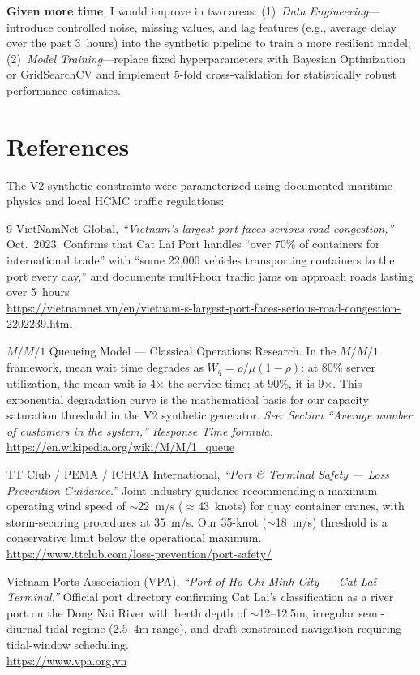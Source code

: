 \documentclass[11pt, a4paper]{article}
\begin{document}
\textbf{Given more time}, I would improve in two areas: (1)~\textit{Data Engineering}---introduce controlled noise, missing values, and lag features (e.g., average delay over the past 3~hours) into the synthetic pipeline to train a more resilient model; (2)~\textit{Model Training}---replace fixed hyperparameters with Bayesian Optimization or GridSearchCV and implement 5-fold cross-validation for statistically robust performance estimates.

\newpage
\section{References}
The V2 synthetic constraints were parameterized using documented maritime physics and local HCMC traffic regulations:

\begin{thebibliography}{9}
VietNamNet Global, \textit{``Vietnam's largest port faces serious road congestion,''} Oct.\ 2023. Confirms that Cat Lai Port handles ``over 70\% of containers for international trade'' with ``some 22,000 vehicles transporting containers to the port every day,'' and documents multi-hour traffic jams on approach roads lasting over 5~hours. \\
\url{https://vietnamnet.vn/en/vietnam-s-largest-port-faces-serious-road-congestion-2202239.html}

$M/M/1$ Queueing Model --- Classical Operations Research. In the $M/M/1$ framework, mean wait time degrades as $W_q = \rho / \mu(1 - \rho)$: at 80\% server utilization, the mean wait is 4$\times$ the service time; at 90\%, it is 9$\times$. This exponential degradation curve is the mathematical basis for our capacity saturation threshold in the V2 synthetic generator. \textit{See: Section ``Average number of customers in the system,'' Response Time formula.} \\
\url{https://en.wikipedia.org/wiki/M/M/1_queue}

TT Club / PEMA / ICHCA International, \textit{``Port \& Terminal Safety --- Loss Prevention Guidance.''} Joint industry guidance recommending a maximum operating wind speed of $\sim$22~m/s ($\approx$43~knots) for quay container cranes, with storm-securing procedures at 35~m/s. Our 35-knot ($\sim$18~m/s) threshold is a conservative limit below the operational maximum. \\
\url{https://www.ttclub.com/loss-prevention/port-safety/}

Vietnam Ports Association (VPA), \textit{``Port of Ho Chi Minh City --- Cat Lai Terminal.''} Official port directory confirming Cat Lai's classification as a river port on the Dong Nai River with berth depth of $\sim$12--12.5m, irregular semi-diurnal tidal regime (2.5--4m range), and draft-constrained navigation requiring tidal-window scheduling. \\
\url{https://www.vpa.org.vn}
\end{thebibliography}
\end{document}

